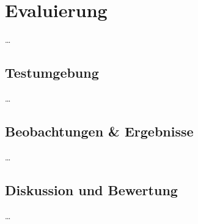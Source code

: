 
\chapter{Evaluierung}
\ldots

\section{Testumgebung}
\ldots

\section{Beobachtungen \& Ergebnisse}
\ldots

\section{Diskussion und Bewertung}
\ldots